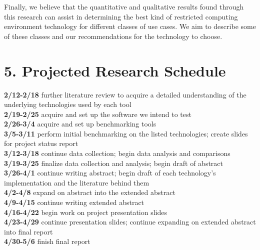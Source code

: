 \documentclass{proc}
\begin{document}
Finally, we believe that the quantitative and qualitative results found through this research can assist in determining the best kind of restricted computing environment technology for different classes of use cases. We aim to describe some of these classes and our recommendations for the technology to choose.
\section*{5. Projected Research Schedule}
\textbf{2/12-2/18} further literature review to acquire a detailed understanding of the underlying technologies used by each tool\\
\textbf{2/19-2/25} acquire and set up the software we intend to test\\
\textbf{2/26-3/4} acquire and set up benchmarking tools\\
\textbf{3/5-3/11} perform initial benchmarking on the listed technologies; create slides for project status report\\
\textbf{3/12-3/18} continue data collection; begin data analysis and comparisons\\
\textbf{3/19-3/25} finalize data collection and analysis; begin draft of abstract\\
\textbf{3/26-4/1} continue writing abstract; begin draft of each technology's implementation and the literature behind them\\
\textbf{4/2-4/8} expand on abstract into the extended abstract\\
\textbf{4/9-4/15} continue writing extended abstract\\
\textbf{4/16-4/22} begin work on project presentation slides\\
\textbf{4/23-4/29} continue presentation slides; continue expanding on extended abstract into final report\\
\textbf{4/30-5/6} finish final report






\end{document}
